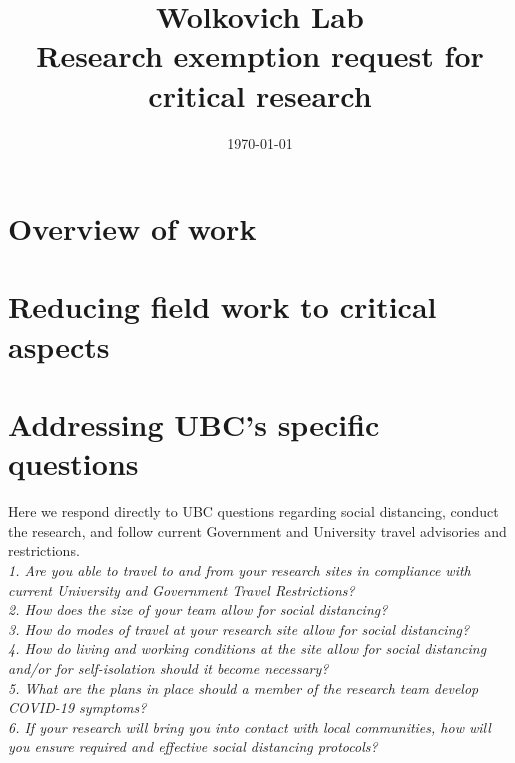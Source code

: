 \documentclass[11pt,letter]{article}
\begin{document}

\renewcommand{\refname}{\CHead{}}

\title{Wolkovich Lab \\ Research exemption request for critical research}
\date{\today}
\maketitle
\tableofcontents


\section{Overview of work}
\section{Reducing field work to critical aspects}
\section{Addressing UBC's specific questions}
Here we respond directly to UBC questions regarding social distancing, conduct the research, and follow current Government and University travel advisories and restrictions.\\

\emph{1. Are you able to travel to and from your research sites in compliance with current University and Government Travel Restrictions?}\\

\emph{2. How does the size of your team allow for social distancing?}\\

\emph{3. How do modes of travel at your research site allow for social distancing?}\\

\emph{4. How do living and working conditions at the site allow for social distancing and/or for self-isolation should it become necessary?}\\

\emph{5. What are the plans in place should a member of the research team develop COVID-19 symptoms?}\\

\emph{6. If your research will bring you into contact with local communities, how will you ensure required and effective social distancing protocols?}\\
\end{document}

